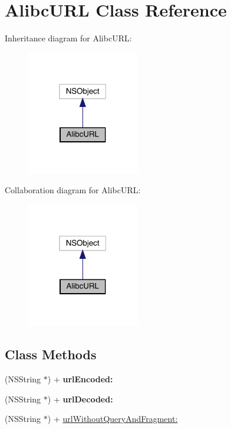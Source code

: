 \hypertarget{interface_alibc_u_r_l}{}\section{Alibc\+U\+RL Class Reference}
\label{interface_alibc_u_r_l}


Inheritance diagram for Alibc\+U\+RL\+:\nopagebreak
\begin{figure}[H]
\begin{center}
\leavevmode
\includegraphics[width=139pt]{interface_alibc_u_r_l__inherit__graph}
\end{center}
\end{figure}


Collaboration diagram for Alibc\+U\+RL\+:\nopagebreak
\begin{figure}[H]
\begin{center}
\leavevmode
\includegraphics[width=139pt]{interface_alibc_u_r_l__coll__graph}
\end{center}
\end{figure}
\subsection*{Class Methods}
\begin{DoxyCompactItemize}
\item 
\mbox{\label{interface_alibc_u_r_l_a991e407a5b22344df14df18788df6923}} 
(N\+S\+String $\ast$) + {\bfseries url\+Encoded\+:}
\item 
\mbox{\label{interface_alibc_u_r_l_a409538d032592aae1925615323403241}} 
(N\+S\+String $\ast$) + {\bfseries url\+Decoded\+:}
\item 
(N\+S\+String $\ast$) + \mbox{\hyperlink{interface_alibc_u_r_l_af8b549ff1e1dfb5b236be3e3fd8d1dae}{url\+Without\+Query\+And\+Fragment\+:}}
\end{DoxyCompactItemize}


